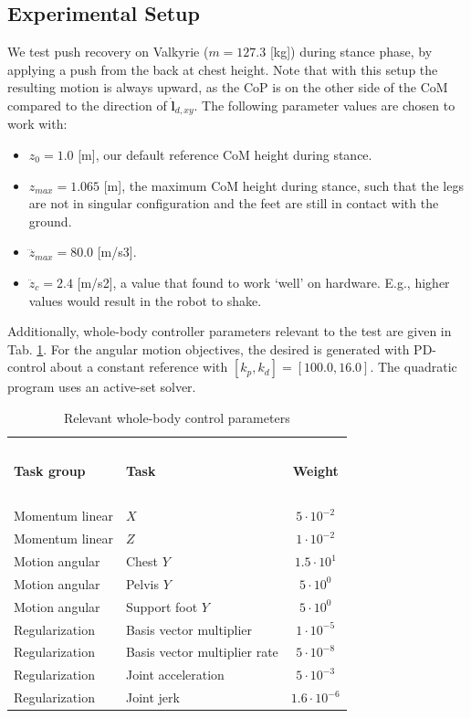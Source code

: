 \documentclass[letterpaper, 10 pt, conference]{ieeeconf}  %
\newcommand{\zmax}{z_{max}}
\begin{document}
\subsection{Experimental Setup}
We test push recovery on Valkyrie ($m=127.3$ [kg]) during stance phase, by applying a push from the back at chest height. Note that with this setup the resulting motion is always upward, as the CoP is on the other side of the CoM compared to the direction of $\dot{\mathbf{l}}_{d,xy}$. The following parameter values are chosen to work with:
\begin{itemize}
\item $z_0=1.0$ [m], our default reference CoM height during stance.
\item $\zmax=1.065$ [m], the maximum CoM height during stance, such that the legs are not in singular configuration and the feet are still in contact with the ground.
\item $\dddot{z}_{max} = 80.0$ [m/s3].
\item $\ddot{z}_c=2.4$ [m/s2], a value that found to work `well' on hardware. E.g., higher values would result in the robot to shake. 
\end{itemize}

Additionally, whole-body controller parameters relevant to the test are given in Tab. \ref{tab:params}. For the angular motion objectives, the desired is generated with PD-control about a constant reference with $[k_p, k_d]=[100.0,16.0]$. The quadratic program uses an active-set solver.
\begin{table}[h]
\caption{Relevant whole-body control parameters}
\label{tab:params}
\begin{center}
\begin{tabular}{llc}
\hline~\\[-2ex]
\textbf{Task group} & \textbf{Task} & \textbf{Weight}\\
\hline ~\\[-2ex]
Momentum linear& $X$ & $5 \cdot 10^{-2}$\\
Momentum linear& $Z$ & $1 \cdot 10^{-2}$\\
Motion angular& Chest $Y$ &    $1.5 \cdot 10^1$\\
Motion angular& Pelvis $Y$ &  $5 \cdot 10^0$\\
Motion angular& Support foot $Y$ &  $5 \cdot 10^0$\\
Regularization & Basis vector multiplier&  $1 \cdot 10^{-5}$\\
Regularization & Basis vector multiplier rate & $5 \cdot 10^{-8}$\\
Regularization & Joint acceleration & $5 \cdot 10^{-3}$\\
Regularization & Joint jerk & $1.6 \cdot 10^{-6}$\\
\hline
\end{tabular}
\end{center}
\end{table}
\end{document}

